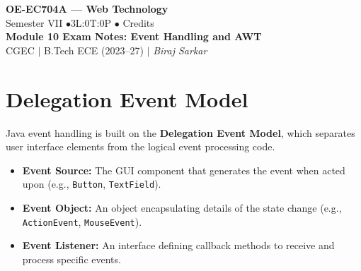 \documentclass[12pt,a4paper]{article}
\begin{document}

\begin{center}
  {\LARGE\bfseries\color{myred} OE-EC704A --- Web Technology}\\[5pt]
  {\normalsize\color{mydark} Semester VII \quad$\bullet$\quad 3L:0T:0P \quad$\bullet$ Credits}\\[3pt]
  {\normalsize\color{myteal}\textbf{Module 10 Exam Notes: Event Handling and AWT}}\\[3pt]
  {\small\color{mydark} CGEC \;$|$\; B.Tech ECE (2023--27) \;$|$\; \textit{Biraj Sarkar}}
\end{center}
\noindent{\color{myred}\rule{\linewidth}{1.5pt}}
\vspace{2pt}

\hypersetup{linkcolor=mydark}
\tableofcontents
\hypersetup{linkcolor=myteal}
\newpage

\section{Delegation Event Model}

Java event handling is built on the \textbf{Delegation Event Model}, which separates user interface elements from the logical event processing code.

\begin{tcolorbox}[defbox, title={\textbf{Core Model Components}}]
\begin{itemize}[leftmargin=*, itemsep=3pt]
  \item \textbf{Event Source:} The GUI component that generates the event when acted upon (e.g., \texttt{Button}, \texttt{TextField}).
  \item \textbf{Event Object:} An object encapsulating details of the state change (e.g., \texttt{ActionEvent}, \texttt{MouseEvent}).
  \item \textbf{Event Listener:} An interface defining callback methods to receive and process specific events.
\end{itemize}
\end{tcolorbox}
\end{document}
